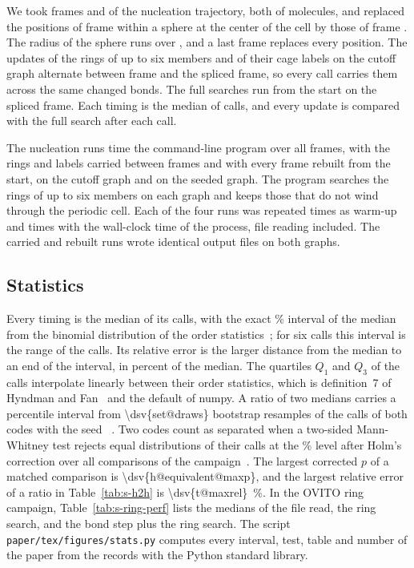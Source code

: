 \documentclass[preprint,12pt]{elsarticle}
\begin{document}
We took frames  and  of the nucleation trajectory, both of  molecules, and replaced the positions of frame  within a sphere at the center of the cell by those of frame .
The radius of the sphere runs over , and a last frame replaces every position.
The updates of the rings of up to six members and of their cage labels on the cutoff graph alternate between frame  and the spliced frame, so every call carries them across the same changed bonds.
The full searches run from the start on the spliced frame.
Each timing is the median of  calls, and every update is compared with the full search after each call.

The nucleation runs time the command-line program over all  frames, with the rings and labels carried between frames and with every frame rebuilt from the start, on the cutoff graph and on the seeded graph.
The program searches the rings of up to six members on each graph and keeps those that do not wind through the periodic cell.
Each of the four runs was repeated  times as warm-up and  times with the wall-clock time of the process, file reading included.
The carried and rebuilt runs wrote identical output files on both graphs.

\subsection{Statistics}
\label{sec:s-stats}

Every timing is the median of its calls, with the exact \% interval of the median from the binomial distribution of the order statistics~\cite{hollander2014nonparametric}; for six calls this interval is the range of the calls.
Its relative error is the larger distance from the median to an end of the interval, in percent of the median.
The quartiles $Q_1$ and $Q_3$ of the calls interpolate linearly between their order statistics, which is definition~7 of Hyndman and Fan~\cite{hyndman1996sample} and the default of numpy.
A ratio of two medians carries a percentile interval from \num{\dsv{set@draws}} bootstrap resamples of the calls of both codes with the seed ~\cite{efron1993bootstrap}.
Two codes count as separated when a two-sided Mann-Whitney test rejects equal distributions of their calls at the \% level after Holm's correction over all  comparisons of the campaign~\cite{holm1979simple}.
The largest corrected $p$ of a matched comparison is \num{\dsv{h@equivalent@maxp}}, and the largest relative error of a ratio in Table~\ref{tab:s-h2h} is \qty{\dsv{t@maxrel}}{\percent}.
In the OVITO ring campaign, Table~\ref{tab:s-ring-perf} lists the medians of the file read, the ring search, and the bond step plus the ring search.
The script \texttt{paper/tex/figures/stats.py} computes every interval, test, table and number of the paper from the records with the Python standard library.
\end{document}
